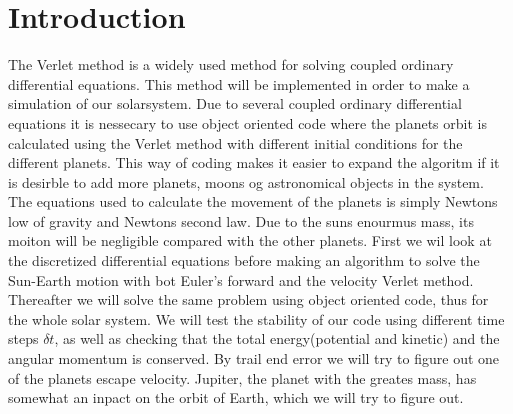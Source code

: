 \documentclass[../main.tex]{subfiles}
\begin{document}
\section{Introduction}\label{introduction}
The Verlet method is a widely used method for solving coupled ordinary differential equations. This method will be implemented  in order to make a simulation of our solarsystem. Due to several coupled ordinary differential equations it is nessecary to use object oriented code where the planets orbit is calculated using the Verlet method with different initial conditions for the different planets. This way of coding makes it easier to expand the algoritm if it is desirble to add more planets, moons og astronomical objects in the system. The equations used to calculate the movement of the planets is simply Newtons low of gravity and Newtons second law. Due to the suns enourmus mass, its moiton will be negligible compared with the other planets.
First we wil look at the discretized differential equations before making an algorithm to solve the Sun-Earth motion with bot Euler's forward and the velocity Verlet method. Thereafter we will solve the same problem using object oriented code, thus for the whole solar system. We will test the stability of our code using different time steps $\delta t$, as well as checking that the total energy(potential and kinetic) and the angular momentum is conserved. By trail end error we will try to figure out one of the planets escape velocity.
Jupiter, the planet with the greates mass, has somewhat an inpact on the orbit of Earth, which we will try to figure out.
\end{document}
